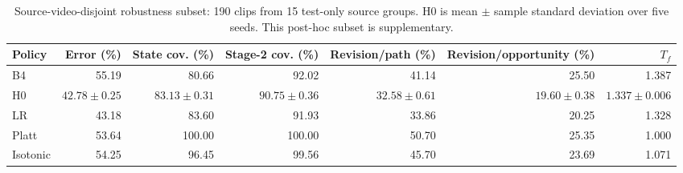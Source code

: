 \begin{table}[t]
\centering
\caption{Source-video-disjoint robustness subset: 190 clips from 15 test-only source groups. H0 is mean \(\pm\) sample standard deviation over five seeds. This post-hoc subset is supplementary.}
\label{tab:source-disjoint}
\begin{tabular}{lrrrrrr}
\toprule
Policy & Error (\%) & State cov. (\%) & Stage-2 cov. (\%) & Revision/path (\%) & Revision/opportunity (\%) & \(T_f\) \\
\midrule
B4 & 55.19 & 80.66 & 92.02 & 41.14 & 25.50 & 1.387 \\
H0 & \(42.78\pm0.25\) & \(83.13\pm0.31\) & \(90.75\pm0.36\) & \(32.58\pm0.61\) & \(19.60\pm0.38\) & \(1.337\pm0.006\) \\
LR & 43.18 & 83.60 & 91.93 & 33.86 & 20.25 & 1.328 \\
Platt & 53.64 & 100.00 & 100.00 & 50.70 & 25.35 & 1.000 \\
Isotonic & 54.25 & 96.45 & 99.56 & 45.70 & 23.69 & 1.071 \\
\bottomrule
\end{tabular}
\end{table}
